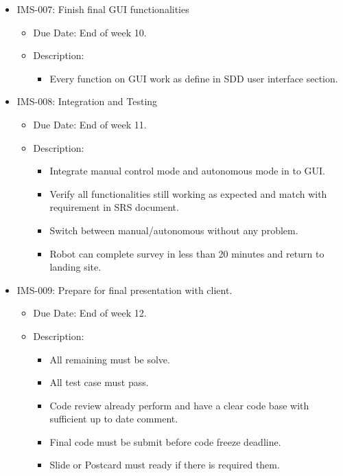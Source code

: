 \begin{itemize}
\begin{itemize}
			\end{itemize}
			\item IMS-007: Finish final GUI functionalities
				\begin{itemize}
				\item Due Date: End of week 10.
				\item Description:
				\begin{itemize}
					\item Every function on GUI work as define in SDD user interface section.
				\end{itemize}
			\end{itemize}
			\item IMS-008: Integration and Testing
			\begin{itemize}
				\item Due Date: End of week 11.
				\item Description:
				\begin{itemize}
					\item Integrate manual control mode and autonomous mode in to GUI.
					\item Verify all functionalities still working as expected and match with requirement in SRS document.
					\item Switch between manual/autonomous without any problem.
					\item Robot can complete survey in less than 20 minutes and return to landing site.
				\end{itemize}
			\end{itemize}
			\item IMS-009: Prepare for final presentation with client.
			\begin{itemize}
				\item Due Date: End of week 12.
				\item Description:
				\begin{itemize}
					\item All remaining must be solve.
					\item All test case must pass.
					\item Code review already perform and have a clear code base with sufficient up to date comment.
					\item Final code must be submit before code freeze deadline.
					\item Slide or Postcard must ready if there is required them.
				\end{itemize}
			\end{itemize}
		\end{itemize}
